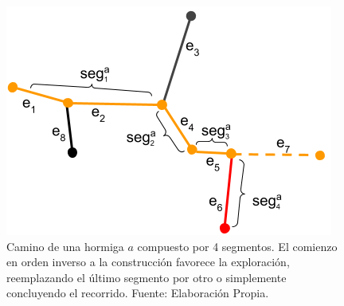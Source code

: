 \begin{figure}[h!]
    \centering
    \includegraphics[scale=0.8]{imagenes/ant_segments_complex_case_H.png}
    \caption{Camino de una hormiga $a$ compuesto por 4 segmentos. El comienzo en orden inverso a la construcci\'on favorece la exploraci\'on, reemplazando el \'ultimo segmento por otro o simplemente concluyendo el recorrido. Fuente: Elaboraci\'on Propia.}
    \label{fig:segmentComplexCaseH}
\end{figure}

